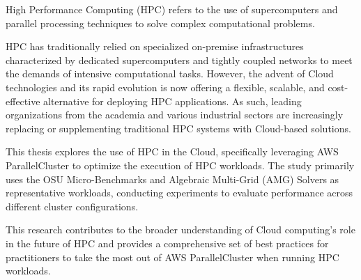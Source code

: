 %
%

High Performance Computing (HPC) refers to the use of supercomputers and parallel processing techniques to solve complex computational problems. 

HPC has traditionally relied on specialized on-premise infrastructures characterized by dedicated supercomputers and tightly coupled networks to meet the demands of intensive computational tasks. However, the advent of Cloud technologies and its rapid evolution is now offering a flexible, scalable, and cost-effective alternative for deploying HPC applications.
As such, leading organizations from the academia and various industrial sectors are increasingly replacing or supplementing traditional HPC systems with Cloud-based solutions.

This thesis explores the use of HPC in the Cloud, specifically leveraging AWS ParallelCluster to optimize the execution of HPC workloads. The study primarily uses the OSU Micro-Benchmarks and Algebraic Multi-Grid (AMG) Solvers as representative workloads, conducting experiments to evaluate performance across different cluster configurations.

This research contributes to the broader understanding of Cloud computing's role in the future of HPC and provides a comprehensive set of best practices for practitioners to take the most out of AWS ParallelCluster when running HPC workloads.